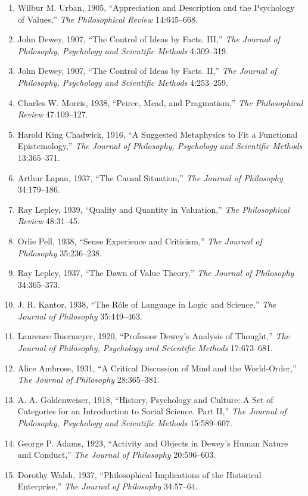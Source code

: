 \documentclass[
]{article}
\begin{document}
\begin{enumerate}
\def\labelenumi{\arabic{enumi}.}
\item
  Wilbur M. Urban, 1905, ``Appreciation and Description and the
  Psychology of Values,'' \emph{The Philosophical Review} 14:645--668.
\item
  John Dewey, 1907, ``The Control of Ideas by Facts. III,'' \emph{The
  Journal of Philosophy, Psychology and Scientific Methods} 4:309--319.
\item
  John Dewey, 1907, ``The Control of Ideas by Facts. II,'' \emph{The
  Journal of Philosophy, Psychology and Scientific Methods} 4:253--259.
\item
  Charles W. Morris, 1938, ``Peirce, Mead, and Pragmatism,'' \emph{The
  Philosophical Review} 47:109--127.
\item
  Harold King Chadwick, 1916, ``A Suggested Metaphysics to Fit a
  Functional Epistemology,'' \emph{The Journal of Philosophy, Psychology
  and Scientific Methods} 13:365--371.
\item
  Arthur Lapan, 1937, ``The Causal Situation,'' \emph{The Journal of
  Philosophy} 34:179--186.
\item
  Ray Lepley, 1939, ``Quality and Quantity in Valuation,'' \emph{The
  Philosophical Review} 48:31--45.
\item
  Orlie Pell, 1938, ``Sense Experience and Criticism,'' \emph{The
  Journal of Philosophy} 35:236--238.
\item
  Ray Lepley, 1937, ``The Dawn of Value Theory,'' \emph{The Journal of
  Philosophy} 34:365--373.
\item
  J. R. Kantor, 1938, ``The Rôle of Language in Logic and Science,''
  \emph{The Journal of Philosophy} 35:449--463.
\item
  Laurence Buermeyer, 1920, ``Professor Dewey's Analysis of Thought,''
  \emph{The Journal of Philosophy, Psychology and Scientific Methods}
  17:673--681.
\item
  Alice Ambrose, 1931, ``A Critical Discussion of Mind and the
  World-Order,'' \emph{The Journal of Philosophy} 28:365--381.
\item
  A. A. Goldenweiser, 1918, ``History, Psychology and Culture: A Set of
  Categories for an Introduction to Social Science. Part II,'' \emph{The
  Journal of Philosophy, Psychology and Scientific Methods} 15:589--607.
\item
  George P. Adams, 1923, ``Activity and Objects in Dewey's Human Nature
  and Conduct,'' \emph{The Journal of Philosophy} 20:596--603.
\item
  Dorothy Walsh, 1937, ``Philosophical Implications of the Historical
  Enterprise,'' \emph{The Journal of Philosophy} 34:57--64.
\end{enumerate}
\end{document}
